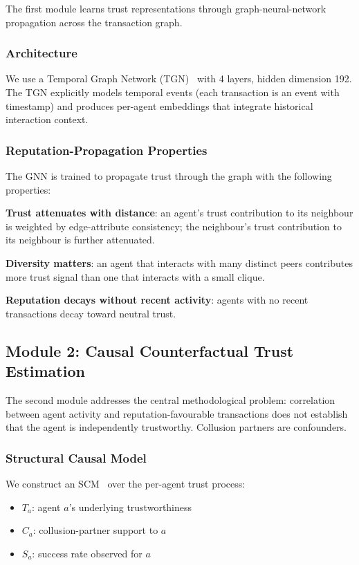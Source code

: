 \documentclass[sigconf,nonacm]{acmart}
\begin{document}
The first module learns trust representations through graph-neural-network
propagation across the transaction graph.

\subsubsection{Architecture}

We use a Temporal Graph Network (TGN)~\cite{rossi2020tgn} with 4
layers, hidden dimension 192. The TGN explicitly models temporal
events (each transaction is an event with timestamp) and produces
per-agent embeddings that integrate historical interaction context.

\subsubsection{Reputation-Propagation Properties}

The GNN is trained to propagate trust through the graph with the
following properties:

\textbf{Trust attenuates with distance}: an agent's trust contribution
to its neighbour is weighted by edge-attribute consistency; the
neighbour's trust contribution to its neighbour is further attenuated.

\textbf{Diversity matters}: an agent that interacts with many distinct
peers contributes more trust signal than one that interacts with a
small clique.

\textbf{Reputation decays without recent activity}: agents with no
recent transactions decay toward neutral trust.

\subsection{Module 2: Causal Counterfactual Trust Estimation}

The second module addresses the central methodological problem:
correlation between agent activity and reputation-favourable
transactions does not establish that the agent is independently
trustworthy. Collusion partners are confounders.

\subsubsection{Structural Causal Model}

We construct an SCM~\cite{pearl2009causality} over the per-agent
trust process:

\begin{itemize}
  \item $T_a$: agent $a$'s underlying trustworthiness
  \item $C_a$: collusion-partner support to $a$
  \item $S_a$: success rate observed for $a$
\end{itemize}
\end{document}
